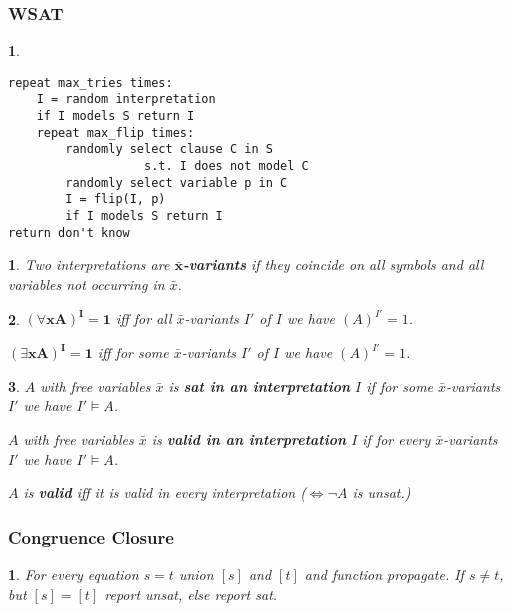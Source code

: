 \documentclass[]{article}
\newtheorem*{green}{}
\newtheorem*{red}{}
\newtheorem*{blue}{}
\begin{document}
\begin{multicols}{3}
\begin{minipage}[t]{.31\textwidth}
\end{minipage}\hfil

\begin{minipage}[t]{.31\textwidth}
\subsubsection*{WSAT}
\begin{red}
\begin{verbatim}
repeat max_tries times:
    I = random interpretation
    if I models S return I
    repeat max_flip times:
        randomly select clause C in S
                   s.t. I does not model C
        randomly select variable p in C
        I = flip(I, p)
        if I models S return I
return don't know	
\end{verbatim}
\end{red}

\begin{green}
Two interpretations are \textbf{$\mathbf{\bar{x}}$-variants} if they coincide on all symbols and all variables not occurring in $\bar{x}$.
\end{green}

\begin{green}
$\mathbf{(\forall x A)^I = 1}$ iff for all $\bar{x}$-variants $I'$ of $I$ we have $(A)^{I'} = 1$.

$\mathbf{(\exists x A)^I = 1}$ iff for some $\bar{x}$-variants $I'$ of $I$ we have $(A)^{I'} = 1$.
\end{green}

\begin{green}
$A$ with free variables $\bar{x}$ is \textbf{sat in an interpretation} $I$ if for some $\bar{x}$-variants $I'$ we have $I'\models A$.

$A$ with free variables $\bar{x}$ is \textbf{valid in an interpretation} $I$ if for every $\bar{x}$-variants $I'$ we have $I'\models A$.

$A$ is \textbf{valid} iff it is valid in every interpretation ($\iff \lnot A$ is unsat.)
\end{green}

\subsubsection*{Congruence Closure}
\begin{blue}
	For every equation $s=t$ union $[s]$ and $[t]$ and function propagate. If $s \not= t$, but $[s] = [t]$ report unsat, else report sat.
\end{blue}


\end{minipage}
\end{multicols}
\end{document}
